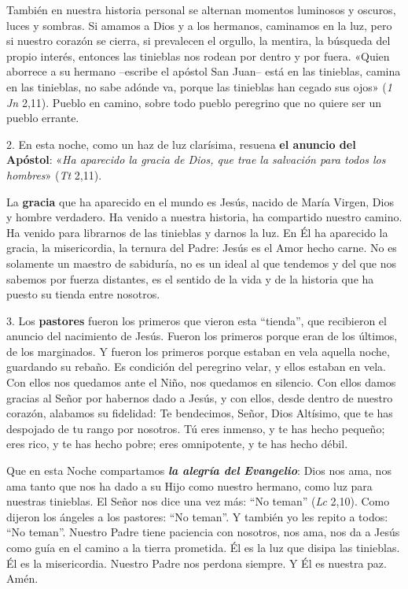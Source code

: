 \documentclass[]{article}
\begin{document}
También en nuestra historia personal se alternan momentos luminosos y
oscuros, luces y sombras. Si amamos a Dios y a los hermanos, caminamos
en la luz, pero si nuestro corazón se cierra, si prevalecen el orgullo,
la mentira, la búsqueda del propio interés, entonces las tinieblas nos
rodean por dentro y por fuera. «Quien aborrece a su hermano --escribe el
apóstol San Juan-- está en las tinieblas, camina en las tinieblas, no
sabe adónde va, porque las tinieblas han cegado sus ojos» (\emph{1 Jn}
2,11). Pueblo en camino, sobre todo pueblo peregrino que no quiere ser
un pueblo errante.

2. En esta noche, como un haz de luz clarísima, resuena \textbf{el
anuncio del Apóstol}: «\emph{Ha aparecido la gracia de Dios, que trae la
salvación para todos los hombres}» (\emph{Tt} 2,11).

La \textbf{gracia} que ha aparecido en el mundo es Jesús, nacido de
María Virgen, Dios y hombre verdadero. Ha venido a nuestra historia, ha
compartido nuestro camino. Ha venido para librarnos de las tinieblas y
darnos la luz. En Él ha aparecido la gracia, la misericordia, la ternura
del Padre: Jesús es el Amor hecho carne. No es solamente un maestro de
sabiduría, no es un ideal al que tendemos y del que nos sabemos por
fuerza distantes, es el sentido de la vida y de la historia que ha
puesto su tienda entre nosotros.

3. Los \textbf{pastores} fueron los primeros que vieron esta ``tienda'',
que recibieron el anuncio del nacimiento de Jesús. Fueron los primeros
porque eran de los últimos, de los marginados. Y fueron los primeros
porque estaban en vela aquella noche, guardando su rebaño. Es condición
del peregrino velar, y ellos estaban en vela. Con ellos nos quedamos
ante el Niño, nos quedamos en silencio. Con ellos damos gracias al Señor
por habernos dado a Jesús, y con ellos, desde dentro de nuestro corazón,
alabamos su fidelidad: Te bendecimos, Señor, Dios Altísimo, que te has
despojado de tu rango por nosotros. Tú eres inmenso, y te has hecho
pequeño; eres rico, y te has hecho pobre; eres omnipotente, y te has
hecho débil.

Que en esta Noche compartamos \emph{\textbf{la alegría del Evangelio}}:
Dios nos ama, nos ama tanto que nos ha dado a su Hijo como nuestro
hermano, como luz para nuestras tinieblas. El Señor nos dice una vez
más: ``No teman'' (\emph{Lc} 2,10). Como dijeron los ángeles a los
pastores: ``No teman''. Y también yo les repito a todos: ``No teman''.
Nuestro Padre tiene paciencia con nosotros, nos ama, nos da a Jesús como
guía en el camino a la tierra prometida. Él es la luz que disipa las
tinieblas. Él es la misericordia. Nuestro Padre nos perdona siempre. Y
Él es nuestra paz. Amén.
\end{document}
